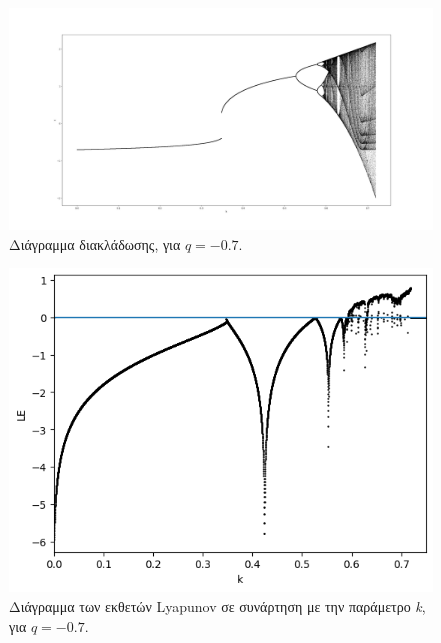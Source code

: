 \begin{figure}[ht]
	\centering
	\includegraphics[width=1\linewidth]{LateX images/graphs q07/g1}
	\caption{ Διάγραμμα διακλάδωσης, για $q=-0.7$.}
	\label{f:g12}
\end{figure}
\begin{figure}[ht]
	\centering
	\includegraphics[width=1\linewidth]{"LateX images/graphs q07/g2 "}
	\caption{Διάγραμμα των εκθετών Lyapunov σε συνάρτηση με την παράμετρο \emph{k}, για $q=-0.7$.}
	\label{f:g13}
\end{figure}

